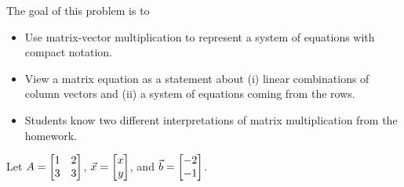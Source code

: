 	\question
	\begin{annotation}
		\begin{goals}

			The goal of this problem is to
			\begin{itemize}
				\item Use matrix-vector multiplication to represent a system of equations
					with compact notation.
				\item View a matrix equation as a statement about (i) linear combinations of column vectors
					and (ii) a system of equations coming from the rows.
			\end{itemize}
		\end{goals}

		\begin{notes}
			\begin{itemize}
				\item Students know two different interpretations of matrix multiplication from
					the homework.
			\end{itemize}
		\end{notes}
	\end{annotation}
	Let $A=\mat{1&2\\3&3}$, $\vec x=\mat{x\\y}$, and $\vec b=\mat{-2\\-1}$.
